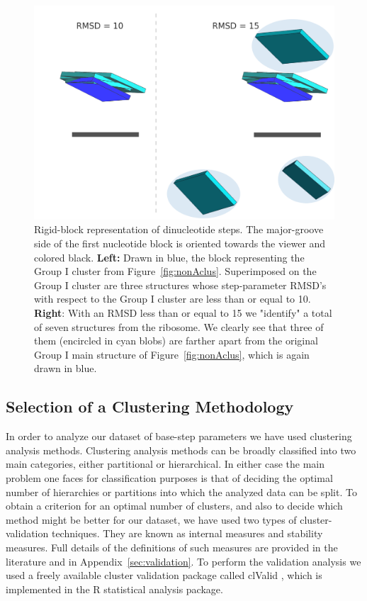 \begin{figure}[htp]
 \centering
\includegraphics[angle=0, scale=1.5]{Chapter2/G1at10_15b.png}
\caption{Rigid-block   representation  of  dinucleotide   steps.   The
  major-groove side of the  first nucleotide block is oriented towards
  the  viewer and colored  black.  \textbf{Left:}  Drawn in  blue, the
  block     representing     the      Group     I     cluster     from
  Figure~\ref{fig:nonAclus}. Superimposed  on the Group  I cluster are
  three  structures whose  step-parameter RMSD's  with respect  to the
  Group I cluster  are less than or equal  to 10. \textbf{Right}: With
  an RMSD  less than  or equal to  15 we  "identify" a total  of seven
  structures  from the  ribosome. We  clearly see  that three  of them
  (encircled in cyan blobs) are  farther apart from the original Group
  I main structure of  Figure~\ref{fig:nonAclus}, which is again drawn
  in blue.}
 \label{fig:superimpose}
\end{figure}

\subsection{Selection of a Clustering Methodology}
In order to  analyze our dataset of base-step  parameters we have used
clustering  analysis  methods.   Clustering  analysis methods  can  be
broadly  classified into  two main  categories, either  partitional or
hierarchical.   In  either  case   the  main  problem  one  faces  for
classification  purposes is  that of  deciding the  optimal  number of
hierarchies or partitions  into which the analyzed data  can be split.
To obtain a  criterion for an optimal number of  clusters, and also to
decide which method might be better  for our dataset, we have used two
types of  cluster-validation techniques.   They are known  as internal
measures and  stability measures.  Full details of  the definitions of
such  measures   are  provided  in   the  literature  \cite{handl2005,
  brock2008}  and in  Appendix~\ref{sec:validation}.   To perform  the
validation  analysis we  used  a freely  available cluster  validation
package called clValid \cite{brock2008}, which is implemented in the R
\cite{rcite} statistical analysis package.

